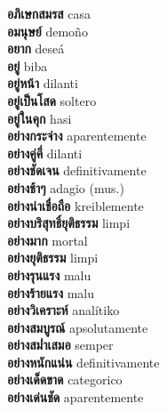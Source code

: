 \textbf{ อภิเษกสมรส  } casa \\
\textbf{ อมนุษย์  } demoño \\
\textbf{ อยาก  } deseá \\
\textbf{ อยู่  } biba \\
\textbf{ อยู่หน้า  } dilanti \\
\textbf{ อยู่เป็นโสด  } soltero \\
\textbf{ อยู่ในคุก  } hasi \\
\textbf{ อย่างกระจ่าง  } aparentemente \\
\textbf{ อย่างคู่คี่  } dilanti \\
\textbf{ อย่างชัดเจน  } definitivamente \\
\textbf{ อย่างช้าๆ  } adagio (mus.) \\
\textbf{ อย่างน่าเชื่อถือ  } kreiblemente \\
\textbf{ อย่างบริสุทธิ์ยุติธรรม  } limpi \\
\textbf{ อย่างมาก  } mortal \\
\textbf{ อย่างยุติธรรม  } limpi \\
\textbf{ อย่างรุนแรง  } malu \\
\textbf{ อย่างร้ายแรง  } malu \\
\textbf{ อย่างวิเคราะห์  } analítiko \\
\textbf{ อย่างสมบูรณ์  } apsolutamente \\
\textbf{ อย่างสม่ำเสมอ  } semper \\
\textbf{ อย่างหนักแน่น  } definitivamente \\
\textbf{ อย่างเด็ดขาด  } categorico \\
\textbf{ อย่างเด่นชัด  } aparentemente \\
